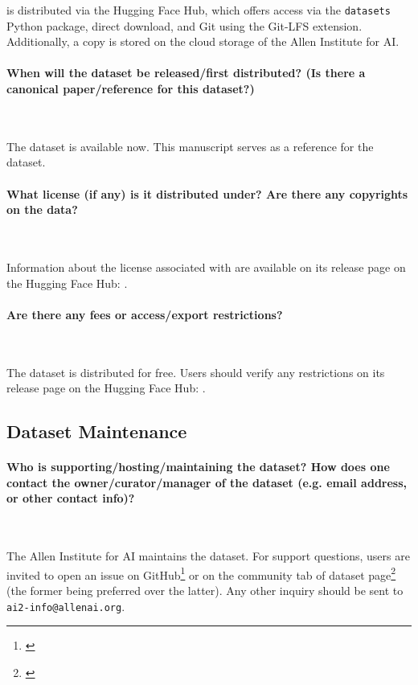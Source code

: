 \dolma is distributed via the Hugging Face Hub, which offers access via the \texttt{datasets}~\citep{Lhoest_Datasets_A_Community_2021} Python package, direct download, and Git using the Git-LFS extension.
Additionally, a copy is stored on the cloud storage of 
the Allen Institute for AI.

\paragraph{When will the dataset be released/first distributed? (Is there a canonical paper/reference for this dataset?)}~

The dataset is available now. 
This manuscript serves as a reference for the dataset.

\paragraph{What license (if any) is it distributed under? Are there any copyrights on the data?}~

Information about the license associated with \dolma are available on its release page on the Hugging Face Hub: \href{https://huggingface.co/datasets/allenai/dolma}{}.

\paragraph{Are there any fees or access/export restrictions?}~

The dataset is distributed for free. 
Users should verify any restrictions on its release page on the Hugging Face Hub: \href{https://huggingface.co/datasets/allenai/dolma}{}.




\subsection{Dataset Maintenance}

\paragraph{Who is supporting/hosting/maintaining the dataset? How does one contact the owner/curator/manager of the dataset (e.g. email address, or other contact info)?}~

The Allen Institute for AI maintains the dataset. 
For support questions, users are invited to open an issue on GitHub\footnote{\href{https://github.com/allenai/dolma/issues}{}} or on the community tab of dataset page\footnote{\href{https://huggingface.co/datasets/allenai/dolma/discussions}{}} (the former being preferred over the latter).
Any other inquiry should be sent to \texttt{ai2-info@allenai.org}.


